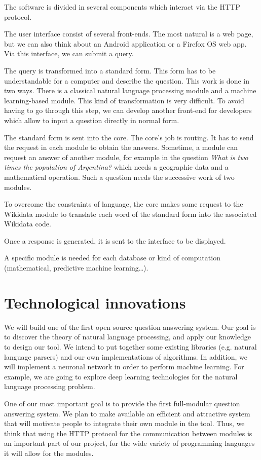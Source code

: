 \documentclass[a4paper,10pt]{article}
\begin{document}
The software is divided in several components which interact via the HTTP protocol.

The user interface consist of several front-ends. The most natural is
a web page, but we can also think about an Android application
or a Firefox OS web app. Via this interface, we can submit a query.

The query is transformed into a standard form. This form has to be understandable 
for a computer and describe the question. This work is done in two ways. There is 
a classical natural language processing module and a machine learning-based module. 
This kind of transformation is very difficult. To avoid having to go through this 
step, we can develop another front-end for developers which allow to input a question
 directly in normal form.

The standard form is sent into the core. The core's job is routing. It has to send 
the request in each module to obtain the answers. Sometime, a module can request 
an answer of another module, for example in the question \emph{What is two times the 
population of Argentina?} which needs a geographic data and a mathematical
 operation. Such a question needs the successive work of two modules.

To overcome the constraints of language, the core makes some request to the Wikidata
 module to translate each word of the standard form into the associated Wikidata 
 code.

Once a response is generated, it is sent to the interface to be displayed.

A specific module is needed for each database or kind of computation (mathematical, 
predictive machine learning\ldots).

\section{Technological innovations}

We will build one of the first open source question answering system. 
Our goal is to discover the theory of natural language processing, and apply our 
knowledge to design our tool. We intend to put together some existing libraries 
(e.g. natural language parsers) and our own implementations of algorithms. In 
addition, we will implement a neuronal network in order to 
perform machine learning. For example, we are going to explore deep learning
technologies for the natural language processing problem.

One of our most important goal is to provide the first full-modular question 
answering system. We plan to make available an efficient and 
attractive system that will motivate people to integrate their own module in the 
tool. Thus, we think that using the HTTP protocol for the communication between 
modules is an important part of our project, for the wide variety 
of programming languages it will allow for the modules.
\end{document}
